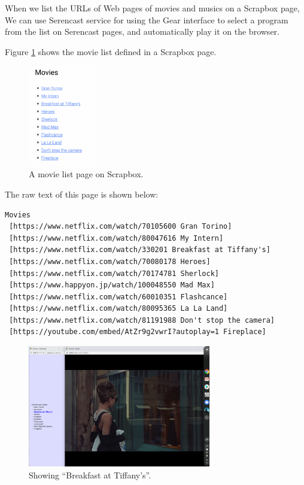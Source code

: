 \documentclass[conference]{IEEEtran}
\def\SC{Serencast}
\def\SB{Scrapbox}
\begin{document}
When we list the URLs of Web pages of
movies and musics on a {\SB} page,
We can use {\SC} service
for using the Gear interface to select a program from the
list on {\SC} pages, and automatically play it on the browser.

Figure \ref{movielist} shows the movie list defined in a {\SB} page.

\begin{figure}[H]
\centerline{\includegraphics[width=30mm,bb=0 0 387 568]{figures/2b97930bf5730fcaf4d9c0adeb9c5f6e.png}}
\caption{A movie list page on {\SB}.}
\label{movielist}
\end{figure}

The raw text of this page is shown below:

{\scriptsize
\begin{verbatim}
Movies
 [https://www.netflix.com/watch/70105600 Gran Torino]
 [https://www.netflix.com/watch/80047616 My Intern]
 [https://www.netflix.com/watch/330201 Breakfast at Tiffany's]
 [https://www.netflix.com/watch/70080178 Heroes]
 [https://www.netflix.com/watch/70174781 Sherlock]
 [https://www.happyon.jp/watch/100048550 Mad Max]
 [https://www.netflix.com/watch/60010351 Flashcance]
 [https://www.netflix.com/watch/80095365 La La Land]
 [https://www.netflix.com/watch/81191988 Don't stop the camera]
 [https://youtube.com/embed/AtZr9g2vwrI?autoplay=1 Fireplace]
\end{verbatim}}

\begin{figure}[H]
\centerline{\includegraphics[width=80mm,bb=0 0 2400 1600]{figures/e8ae562a5a68a1955ac70b4faed9a146.png}}
\caption{Showing ``Breakfast at Tiffany's''.}
\label{tiffany}
\end{figure}
\end{document}
